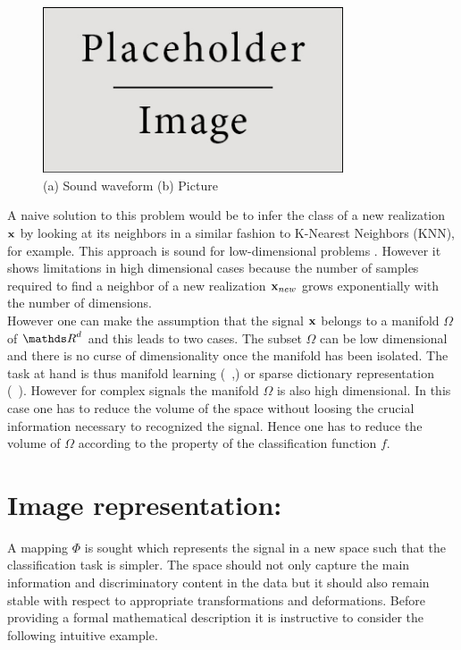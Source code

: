 \documentclass[a4paper,11pt]{report}
\begin{document}
		\begin{figure}
			\begin{center}
				\includegraphics[width=3.5in]{placeholder.jpg}
			  \caption[High dimensional signals]{(a) Sound waveform (b) Picture}
			  \label{fig:highDim signals}
			\end{center}
		\end{figure}
				
		A naive solution to this problem would be to infer the class of a new realization ${\bf x}$ by looking at its neighbors in a similar fashion to K-Nearest Neighbors (KNN), for example. This approach is sound for low-dimensional problems \cite{cover1967nearest}. However it shows limitations in high dimensional cases \cite{beyer1999nearest} because the number of samples required to find a neighbor of a new realization ${\bf x}_{new}$ grows exponentially with the number of dimensions.\\
			
		However one can make the assumption that the signal ${\bf x}$ belongs to a manifold $\Omega$ of $\dsR^{d}$ and this leads to two cases. The subset $\Omega$ can be low dimensional and there is no curse of dimensionality once the manifold has been isolated. The task at hand is thus manifold learning (~\cite{lin2008riemannian},\cite{zhang2012adaptive}) or sparse dictionary representation (~\cite{kreutz2003dictionary}). However for complex signals the manifold $\Omega$ is also high dimensional. In this case one has to reduce the volume of the space without loosing the crucial information necessary to recognized the signal. Hence one has to reduce the volume of $\Omega$ according to the property of the classification function $f$.
		
	\section{Image representation:}
		\label{sec:Intro/Image rep}
		
		A mapping $\Phi$ is sought which represents the signal in a new space such that the classification task is simpler. The space should not only capture the main information and discriminatory content in the data but it should also remain stable with respect to appropriate transformations and deformations. Before providing a formal mathematical description it is instructive to consider the following intuitive example.
%     
\end{document}
